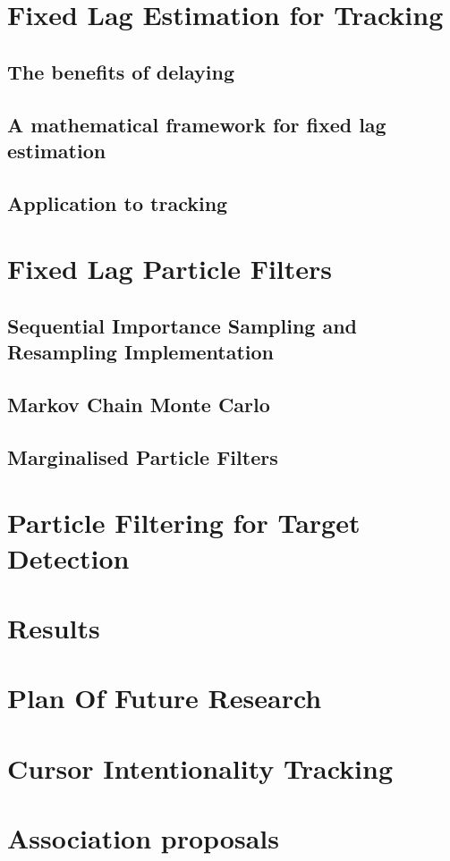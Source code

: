 \documentclass{RJWThesis}
\begin{document}
\chapter{Fixed Lag Estimation for Tracking}\label{FixedLag}
\section{The benefits of delaying}

\section{A mathematical framework for fixed lag estimation}
\label{sec:FixedLag2}
\section{Application to tracking}\label{FixedLag_App}


\chapter{Fixed Lag Particle Filters}
\section{Sequential Importance Sampling and Resampling Implementation}

\section{Markov Chain Monte Carlo}

\section{Marginalised Particle Filters}


\chapter{Particle Filtering for Target Detection}


\chapter{Results}



\chapter{Plan Of Future Research}


\chapter{Cursor Intentionality Tracking}


\cleardoublepage

\appendix
\chapter{Association proposals}



\end{document}
